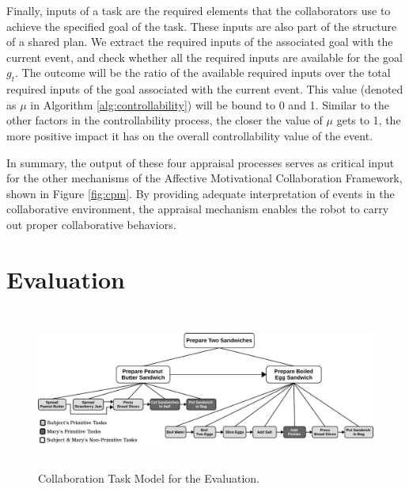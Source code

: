 \documentclass{aamas2016}
\begin{document}
Finally, inputs of a task are the required elements that the collaborators use
to achieve the specified goal of the task. These inputs are also part of the
structure of a shared plan. We extract the required inputs of the associated
goal with the current event, and check whether all the required inputs are
available for the goal $\mathit{g}_{t}$. The outcome will be the ratio of the
available required inputs over the total required inputs of the goal associated
with the current event. This value (denoted as $\mu$ in Algorithm
\ref{alg:controllability}) will be bound to 0 and 1. Similar to the other
factors in the controllability process, the closer the value of $\mu$ gets to 1,
the more positive impact it has on the overall controllability value of the
event.

In summary, the output of these four appraisal processes serves as critical
input for the other mechanisms of the Affective Motivational Collaboration
Framework, shown in Figure \ref{fig:cpm}. By providing adequate interpretation
of events in the collaborative environment, the appraisal mechanism enables the
robot to carry out proper collaborative behaviors.

\section{Evaluation}
\label{sec:user-study}

\begin{figure}
  \centering
  \includegraphics[width=16cm,height=5.25cm]{figure/taskModel-croped.pdf}
  \caption{Collaboration Task Model for the Evaluation.}
  \label{fig:taskModel}
  \vspace*{-5mm}
\end{figure}
\end{document}

